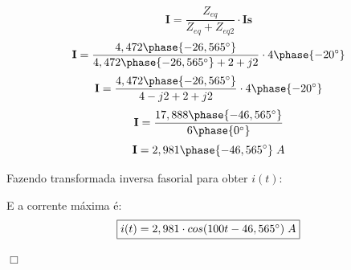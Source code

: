 \documentclass[
	12pt,				%
	oneside,			%
	a4paper,			%
	english,			%
	french,				%
	spanish,			%
	brazil				%
	]{abntex2}
\begin{document}
$$\textbf{I} = \dfrac{Z_{eq}}{Z_{eq} + Z_{eq2}}\cdot \textbf{Is}$$
$$\textbf{I} = \dfrac{4,472\phase{-26,565^{\circ}}}{4,472\phase{-26,565^{\circ}} + 2 + j2}\cdot4\phase{-20^{\circ}}$$
$$\textbf{I} = \dfrac{4,472\phase{-26,565^{\circ}}}{4 - j2 + 2 + j2}\cdot4\phase{-20^{\circ}}$$
$$\textbf{I} = \dfrac{17,888\phase{-46,565^{\circ}}}{6\phase{0^{\circ}}}$$
$$\textbf{I} = 2,981\phase{-46,565^{\circ}}\;A$$

Fazendo transformada inversa fasorial para obter $i(t):$

E a corrente máxima é:
\begin{equation}
    \fbox{$i(t) = 2,981\cdot cos(100t - 46,565^{\circ})\;A$}
\end{equation}

\begin{flushright}
    $\Box$
\end{flushright}
\newpage

\end{document}
